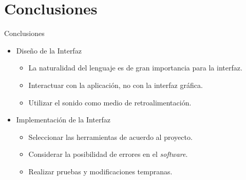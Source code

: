 \section{Conclusiones}

\begin{frame}{Conclusiones}

\begin{itemize}
    \item Diseño de la Interfaz
        \begin{itemize}
            \item La naturalidad del lenguaje es de gran importancia para la interfaz.
            \item Interactuar con la aplicaci\'on, no con la interfaz gr\'afica.
            \item Utilizar el sonido como medio de retroalimentaci\'on.
        \end{itemize}
    \item Implementación de la Interfaz
        \begin{itemize}
            \item Seleccionar las herramientas de acuerdo al \mbox{proyecto}.
            \item Considerar la posibilidad de errores en el \emph{software}.
            \item Realizar pruebas y modificaciones tempranas.
        \end{itemize}
\end{itemize}

\end{frame}

